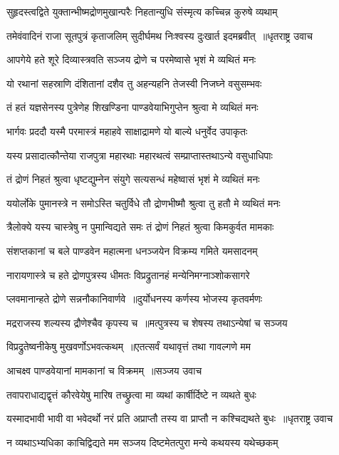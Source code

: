 \twolineshloka
{सुहृदस्त्वद्विते युक्तान्भीष्मद्रोणमुखान्परैः}
{निहतान्युधि संस्मृत्य कच्चिन्न कुरुषे व्यथाम्}


\threelineshloka
{तमेवंवादिनं राजा सूतपुत्रं कृताजलिम्}
{सुदीर्घमथ निःश्वस्य दुःखार्त इदमब्रवीत् ॥धृतराष्ट्र उवाच}
{}


\twolineshloka
{आपगेये हते शूरे दिव्यास्त्रवति सञ्जय}
{द्रोणे च परमेष्वासे भृशं मे व्यथितं मनः}


\twolineshloka
{यो रथानां सहस्राणि दंशितानां दशैव तु}
{अहन्यहनि तेजस्वी निजघ्ने वसुसम्भवः}


\twolineshloka
{तं हतं यज्ञसेनस्य पुत्रेणेह शिखण्डिना}
{पाण्डवेयाभिगुप्तेन श्रुत्वा मे व्यथितं मनः}


\twolineshloka
{भार्गवः प्रददौ यस्मै परमास्त्रं महाहवे}
{साक्षाद्रामणे यो बाल्ये धनुर्वेद उपाकृतः}


\twolineshloka
{यस्य प्रसादात्कौन्तेया राजपुत्रा महारथाः}
{महारथत्वं सम्प्राप्तास्तथाऽन्ये वसुधाधिपाः}


\twolineshloka
{तं द्रोणं निहतं श्रुत्वा धृष्टद्युम्नेन संयुगे}
{सत्यसन्धं महेष्वासं भृशं मे व्यथितं मनः}


\twolineshloka
{ययोर्लोके पुमानस्त्रे न समोऽस्ति चतुर्विधे}
{तौ द्रोणभीष्मौ श्रुत्वा तु हतौ मे व्यथितं मनः}


\twolineshloka
{त्रैलोक्ये यस्य चास्त्रेषु न पुमान्विद्यते समः}
{तं द्रोणं निहतं श्रुत्वा किमकुर्वत मामकाः}


\twolineshloka
{संशप्तकानां च बले पाण्डवेन महात्मना}
{धनञ्जयेन विक्रम्य गमिते यमसादनम्}


\threelineshloka
{नारायणास्त्रे च हते द्रोणपुत्रस्य धीमतः}
{विप्रद्रुतानहं मन्येनिमग्नाञ्शोकसागरे}
{}


\twolineshloka
{प्लवमानान्हते द्रोणे सन्ननौकानिवार्णवे ॥दुर्योधनस्य कर्णस्य भोजस्य कृतवर्मणः}
{}


\twolineshloka
{मद्रराजस्य शल्यस्य द्रौणेश्चैव कृपस्य च ॥मत्पुत्रस्य च शेषस्य तथाऽन्येषां च सञ्जय}
{}


\twolineshloka
{विप्रद्रुतेष्वनीकेषु मुखवर्णोऽभवत्कथम् ॥एतत्सर्वं यथावृत्तं तथा गावल्गणे मम}
{}


\twolineshloka
{आचक्ष्व पाण्डवेयानां मामकानां च विक्रमम् ॥सञ्जय उवाच}
{}


\twolineshloka
{तवापराधाद्यद्वृत्तं कौरवेयेषु मारिष}
{तच्छ्रुत्वा मा व्यथां कार्षीर्दिष्टे न व्यथते बुधः}


\threelineshloka
{यस्मादभावी भावी वा भवेदर्थो नरं प्रति}
{अप्राप्तौ तस्य वा प्राप्तौ न कश्चिद्यथते बुधः ॥धृतराष्ट्र उवाच}
{}


\twolineshloka
{न व्यथाऽभ्यधिका काचिद्विद्यते मम सञ्जय}
{दिष्टमेतत्पुरा मन्ये कथयस्य यथेच्छकम्}


